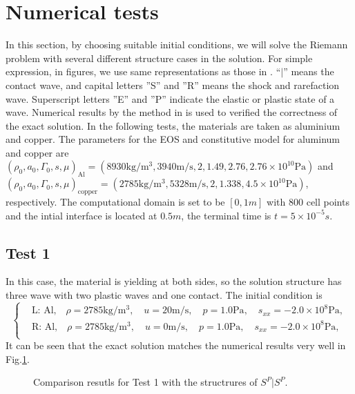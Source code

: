 \documentclass{article}
\numberwithin{equation}{section}
\numberwithin{table}{section}
\begin{document}
\section{Numerical  tests }
In this section, by choosing suitable initial conditions, we will solve the Riemann problem with several different structure cases in the solution. For simple  expression, in figures, we use same representations as those in \cite{gao2018complete}. ``$|$'' means the contact wave, and capital letters ''S'' and ''R'' means the shock and rarefaction wave. Superscript letters ''E'' and  ''P'' indicate the elastic or plastic state of a wave.  Numerical results by the method  in \cite{liumulti} is used to verified the correctness of the exact solution. In the following tests, the materials are taken as  aluminium and copper. The parameters for the EOS and constitutive model for aluminum and copper  are
$ (\rho_0, a_0, \Gamma_0, s, \mu)_{\text{Al}} =(8930 \text{kg}/\text{m}^3, 3940 \text{m}/\text{s},2, 1.49, 2.76 ,2.76\times 10^{10} \text{Pa} )$ and   $(\rho_0, a_0, \Gamma_0, s, \mu)_{\text{copper}} =(2785 \text{kg}/\text{m}^3, 5328 \text{m}/\text{s},2, 1.338,4.5\times 10^{10}\text{Pa})$, respectively. The computational domain is set to be $[0,1m]$ with 800 cell points and the intial interface is located at $0.5m$, the terminal time is $t=5\times 10^{-5}s$.

\subsection{Test 1}
In this case, the material is yielding at both sides, so the solution structure has three wave with two plastic waves and one contact.
The initial condition is
\begin{equation}
 \left\{ \begin{aligned}
&	 \text{L: Al,}\quad  \rho = 2785 \text{kg}/\text{m}^3, \quad  u = 20\text{m}/\text{s}, \quad  p = 1.0\text{Pa}, \quad  s_{xx}=-2.0\times 10^8 \text{Pa},\\
&	 \text{R: Al,}\quad  \rho = 2785 \text{kg}/\text{m}^3, \quad  u = 0\text{m}/\text{s}, \quad  p = 1.0\text{Pa}, \quad  s_{xx}=-2.0\times 10^8 \text{Pa},\\
   \end{aligned}
 \right.
\end{equation}
It can be seen that the exact solution matches the numerical results very well in Fig.\ref{fig:case1}.
\begin{figure}
  \centering


    \caption{Comparison resutls for Test 1 with the structrures of $S^P|S^P$.  }
  \label{fig:case1}
\end{figure}
\end{document}

